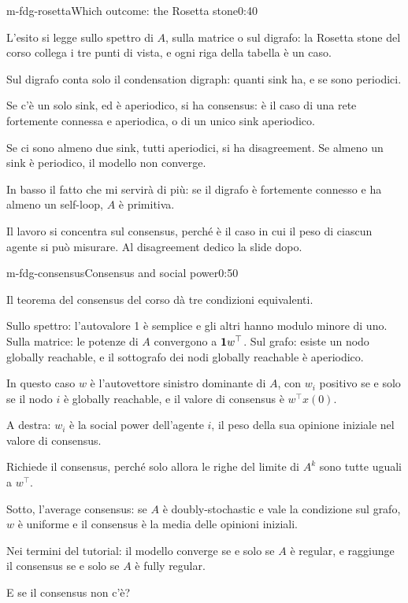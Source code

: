 \begin{slide}{m-fdg-rosetta}{Which outcome: the Rosetta stone}{0:40}
  \begin{discorso}
    \item L'esito si legge sullo spettro di $A$, sulla matrice o sul digrafo: la Rosetta stone del corso collega i tre punti di vista, e ogni riga della tabella è un caso.
    \item Sul digrafo conta solo il condensation digraph: quanti sink ha, e se sono periodici.
    \item Se c'è un solo sink, ed è aperiodico, si ha consensus: è il caso di una rete fortemente connessa e aperiodica, o di un unico sink aperiodico.
    \item Se ci sono almeno due sink, tutti aperiodici, si ha disagreement. Se almeno un sink è periodico, il modello non converge.
    \item In basso il fatto che mi servirà di più: se il digrafo è fortemente connesso e ha almeno un self-loop, $A$ è primitiva.
    \item Il lavoro si concentra sul consensus, perché è il caso in cui il peso di ciascun agente si può misurare. Al disagreement dedico la slide dopo.
  \end{discorso}
\end{slide}

\begin{slide}{m-fdg-consensus}{Consensus and social power}{0:50}
  \begin{discorso}
    \item Il teorema del consensus del corso dà tre condizioni equivalenti.
    \item Sullo spettro: l'autovalore 1 è semplice e gli altri hanno modulo minore di uno. Sulla matrice: le potenze di $A$ convergono a $\mathbf{1} w^\top$. Sul grafo: esiste un nodo globally reachable, e il sottografo dei nodi globally reachable è aperiodico.
    \item In questo caso $w$ è l'autovettore sinistro dominante di $A$, con $w_i$ positivo se e solo se il nodo $i$ è globally reachable, e il valore di consensus è $w^\top x(0)$.
    \item A destra: $w_i$ è la social power dell'agente $i$, il peso della sua opinione iniziale nel valore di consensus.
    \item Richiede il consensus, perché solo allora le righe del limite di $A^k$ sono tutte uguali a $w^\top$.
    \item Sotto, l'average consensus: se $A$ è doubly-stochastic e vale la condizione sul grafo, $w$ è uniforme e il consensus è la media delle opinioni iniziali.
    \item Nei termini del tutorial: il modello converge se e solo se $A$ è regular, e raggiunge il consensus se e solo se $A$ è fully regular.
    \item E se il consensus non c'è?
  \end{discorso}
\end{slide}

